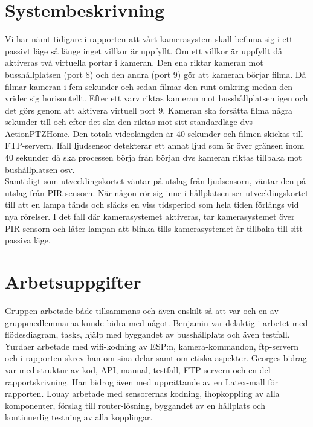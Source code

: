  








\clearpage
\section{Systembeskrivning}
Vi har nämt tidigare i rapporten att vårt kamerasystem skall befinna sig i ett passivt läge så länge inget villkor är uppfyllt. Om ett villkor är uppfyllt då aktiveras två virtuella portar i kameran. Den ena riktar kameran mot busshållplatsen (port 8) och den andra (port 9) gör att kameran börjar filma. Då filmar kameran i fem sekunder och sedan filmar den runt omkring medan den vrider sig horisontellt. Efter ett varv riktas kameran mot busshållplatsen igen och det görs genom att aktivera virtuell port 9. Kameran ska forsätta filma några sekunder till och efter det ska den riktas mot sitt standardläge dvs ActionPTZHome. Den totala videolängden är 40 sekunder och filmen skickas till FTP-servern. Ifall ljudsensor detekterar ett annat ljud som är över gränsen inom 40 sekunder då ska processen börja från början dvs kameran riktas tillbaka mot bushållplatsen osv.\\
 Samtidigt som utvecklingskortet väntar på utslag från ljudsensorn, väntar den på utslag från PIR-sensorn. När någon rör sig inne i hållplatsen ser utvecklingskortet till att en lampa tänds och släcks en viss tidsperiod som hela tiden förlängs vid nya rörelser. I det fall där kamerasystemet aktiveras, tar kamerasystemet över PIR-sensorn och låter lampan att blinka tills kamerasystemet är tillbaka till sitt passiva läge.

\section{Arbetsuppgifter}
Gruppen arbetade både tillsammans och även enskilt så att var och en av gruppmedlemmarna kunde bidra med något. Benjamin var delaktig i arbetet med flödesdiagram, tasks, hjälp med byggandet av busshållplats och även testfall. Yurdaer arbetade med wifi-kodning av ESP:n, kamera-kommandon, ftp-servern och i rapporten skrev han om sina delar samt om etiska aspekter. Georges bidrag var med struktur av kod, API, manual, testfall, FTP-servern och en del rapportskrivning. Han bidrog även med upprättande av en Latex-mall för rapporten. Louay arbetade med sensorernas kodning, ihopkoppling av alla komponenter, förslag till router-lösning, byggandet av en hållplats och kontinuerlig testning av alla kopplingar. 



 



